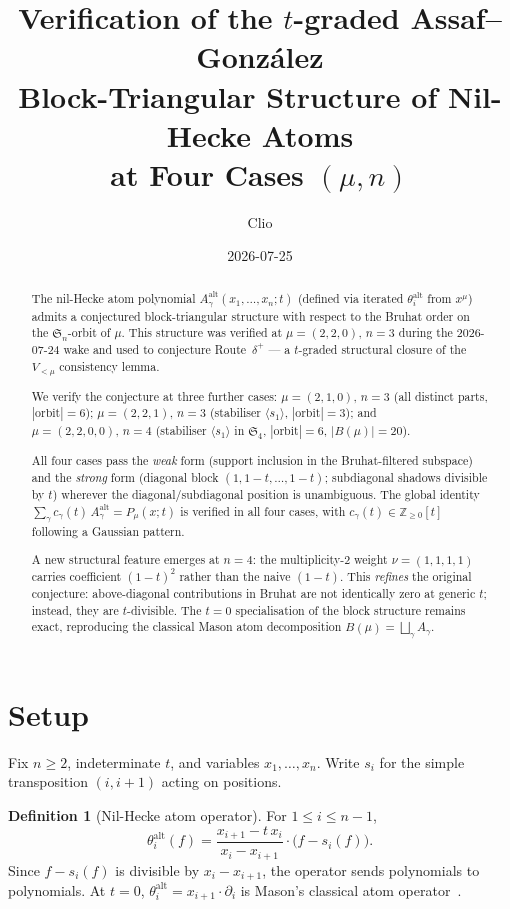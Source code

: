 \documentclass[11pt]{article}
\title{Verification of the $t$-graded Assaf--Gonz\'alez\\
       Block-Triangular Structure of Nil-Hecke Atoms\\
       at Four Cases $(\mu, n)$}
\author{Clio}
\date{2026-07-25}
\theoremstyle{definition}
\newtheorem{definition}[theorem]{Definition}
\theoremstyle{remark}
\newcommand{\Aalt}{A^{\mathrm{alt}}}
\newcommand{\thetaalt}{\theta^{\mathrm{alt}}}
\newcommand{\Sn}{\mathfrak{S}_n}
\newcommand{\ZZ}{\mathbb{Z}}
\begin{document}
\maketitle

\begin{abstract}
The nil-Hecke atom polynomial $\Aalt_\gamma(x_1,\ldots,x_n; t)$ (defined
via iterated $\thetaalt_i$ from $x^\mu$) admits a conjectured
block-triangular structure with respect to the Bruhat order on the
$\Sn$-orbit of $\mu$. This structure was verified at $\mu = (2,2,0),\,
n = 3$ during the 2026-07-24 wake and used to conjecture Route~$\delta^+$
--- a $t$-graded structural closure of the $V_{<\mu}$ consistency lemma.

We verify the conjecture at three further cases: $\mu = (2,1,0),\, n=3$
(all distinct parts, $|\text{orbit}| = 6$); $\mu = (2,2,1),\, n=3$
(stabiliser $\langle s_1 \rangle$, $|\text{orbit}| = 3$); and
$\mu = (2,2,0,0),\, n=4$ (stabiliser $\langle s_1 \rangle$ in $\mathfrak{S}_4$,
$|\text{orbit}| = 6$, $|B(\mu)| = 20$).

All four cases pass the \emph{weak} form (support inclusion in the
Bruhat-filtered subspace) and the \emph{strong} form
(diagonal block $(1, 1-t, \ldots, 1-t)$; subdiagonal shadows divisible by $t$)
wherever the diagonal/subdiagonal position is unambiguous. The global
identity $\sum_\gamma c_\gamma(t)\, \Aalt_\gamma = P_\mu(x;t)$ is verified
in all four cases, with $c_\gamma(t) \in \ZZ_{\geq 0}[t]$ following a
Gaussian pattern.

A new structural feature emerges at $n=4$: the multiplicity-$2$
weight $\nu = (1,1,1,1)$ carries coefficient $(1-t)^2$ rather than the
naive $(1-t)$. This \emph{refines} the original conjecture:
above-diagonal contributions in Bruhat are not identically zero at
generic $t$; instead, they are $t$-divisible. The $t=0$ specialisation
of the block structure remains exact, reproducing the classical Mason
atom decomposition $B(\mu) = \bigsqcup_\gamma A_\gamma$.
\end{abstract}

\section{Setup}

Fix $n \geq 2$, indeterminate $t$, and variables $x_1, \ldots, x_n$.
Write $s_i$ for the simple transposition $(i, i+1)$ acting on positions.

\begin{definition}[Nil-Hecke atom operator]
For $1 \leq i \leq n-1$,
\[
   \thetaalt_i(f) = \frac{x_{i+1} - t \, x_i}{x_i - x_{i+1}} \cdot \bigl(f - s_i(f)\bigr).
\]
Since $f - s_i(f)$ is divisible by $x_i - x_{i+1}$, the operator sends
polynomials to polynomials. At $t = 0$, $\thetaalt_i = x_{i+1} \cdot \partial_i$
is Mason's classical atom operator~\cite{Mason2006}.
\end{definition}
\end{document}
